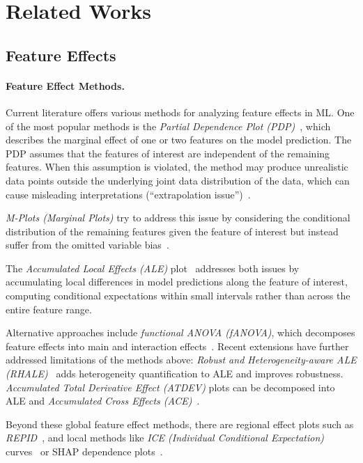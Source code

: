 \documentclass[runningheads]{llncs}
\begin{document}
\section{Related Works}\label{sec:related-works}

\subsection{Feature Effects}

\paragraph{Feature Effect Methods.}
Current literature offers various methods for analyzing feature effects in ML.  %
One of the most popular methods is the \textit{Partial Dependence Plot
    (PDP)}~\cite{friedman_greedy_2001}, which describes the marginal effect of one
or two features on the model prediction. The PDP assumes that the features of
interest are independent of the remaining features. When this assumption is
violated, the method may produce unrealistic data points outside the underlying
joint data distribution of the data, which can cause misleading
interpretations (``extrapolation issue'')~\cite{molnar_interpretable_2022,molnar_general_2022}.

\textit{M-Plots (Marginal Plots)} try to address this issue by considering the
conditional distribution of the remaining features given the feature of interest
but instead suffer from the omitted variable
bias~\cite{apley_visualizing_2020,friedman_greedy_2001}.

The \textit{Accumulated Local Effects (ALE)} plot~\cite{apley_visualizing_2020}
addresses both issues by accumulating local differences in model predictions
along the feature of interest, computing conditional expectations within small
intervals rather than across the entire feature range.

Alternative approaches include \textit{functional ANOVA (fANOVA)}, which
decomposes feature effects into main and interaction
effects~\cite{hooker_discovering_2004}. Recent extensions have further
addressed limitations of the methods above: \textit{Robust
    and Heterogeneity-aware ALE (RHALE)}~\cite{gkolemis_rhale_2023} adds
heterogeneity quantification to ALE and improves robustness.
\textit{Accumulated Total Derivative Effect (ATDEV)} plots can be decomposed
into ALE and \textit{Accumulated Cross Effects (ACE)}~\cite{liu_model_2018}.

Beyond these global feature effect methods, there are regional effect plots
such as \textit{REPID}~\cite{herbinger_repid_2022}, and local methods like
\textit{ICE (Individual Conditional Expectation)}
curves~\cite{goldstein_peeking_2015} or SHAP dependence
plots~\cite{lundberg_local_2020}.
\end{document}
